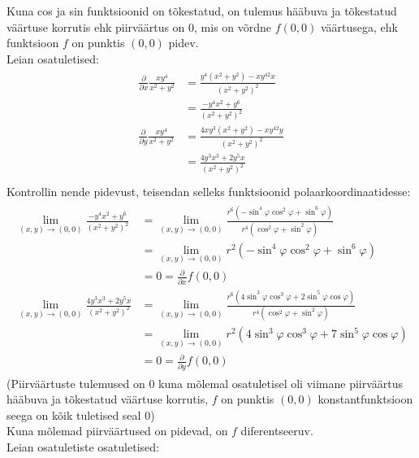 \documentclass{article}
\newcommand{\p}[1]{\frac{\partial}{\partial #1}}
\begin{document}
Kuna cos ja sin funktsioonid on tõkestatud, on tulemus hääbuva ja tõkestatud väärtuse korrutis ehk piirväärtus on 0, mis on võrdne $f(0,0)$ väärtusega, ehk funktsioon $f$ on punktis $(0,0)$ pidev.\\
Leian osatuletised:
\begin{gather*}
\begin{aligned}
\p{x}\frac{xy^4}{x^2+y^2}&=\frac{y^4(x^2+y^2)-xy^42x}{(x^2+y^2)^2}\\
&=\frac{-y^4x^2+y^6}{(x^2+y^2)^2}\\
\p{y}\frac{xy^4}{x^2+y^2}&=\frac{4xy^3(x^2+y^2)-xy^42y}{(x^2+y^2)^2}\\
&=\frac{4y^3x^3+2y^5x}{(x^2+y^2)^2}\\
\end {aligned}
\end{gather*}
Kontrollin nende pidevust, teisendan selleks funktsioonid polaarkoordinaatidesse:
\begin{gather*}
\begin{aligned}
\lim_{(x,y)\to(0,0)}\frac{-y^4x^2+y^6}{(x^2+y^2)^2}&=\lim_{(x,y)\to(0,0)}\frac{r^6(-\sin^4\varphi\cos^2\varphi+\sin^6\varphi)}{r^4(\cos^2\varphi+\sin^2\varphi)}\\
&=\lim_{(x,y)\to(0,0)}r^2(-\sin^4\varphi\cos^2\varphi+\sin^6\varphi)\\
&=0=\p{x}f(0,0)\\
\lim_{(x,y)\to(0,0)}\frac{4y^3x^3+2y^5x}{(x^2+y^2)^2}&=\lim_{(x,y)\to(0,0)}\frac{r^6(4\sin^3\varphi\cos^3\varphi+2\sin^5\varphi\cos\varphi)}{r^4(\cos^2\varphi+\sin^2\varphi)}\\
&=\lim_{(x,y)\to(0,0)}r^2(4\sin^3\varphi\cos^3\varphi+7\sin^5\varphi\cos\varphi)\\
&=0=\p{y}f(0,0)
\end {aligned}
\end{gather*}
(Piirväärtuste tulemused on 0 kuna mõlemal osatuletisel oli viimane piirväärtus hääbuva ja tõkestatud väärtuse korrutis, $f$ on punktis $(0,0)$ konstantfunktsioon seega on kõik tuletised seal 0)\\
Kuna mõlemad piirväärtused on pidevad, on $f$ diferentseeruv.\\
Leian osatuletiste osatuletised:
\end{document}
